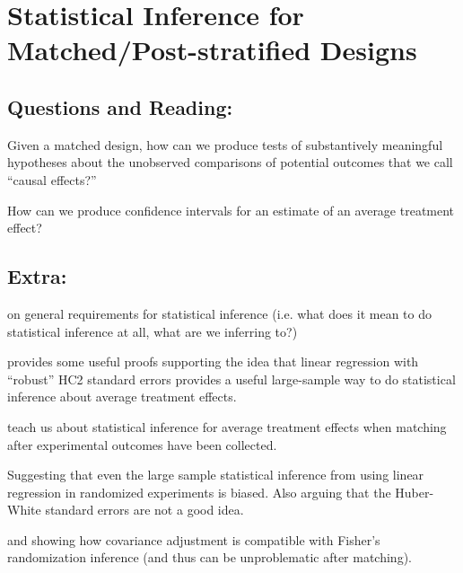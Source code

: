 \documentclass[10pt, letterpaper]{article}
\begin{document}
\AdvanceDate[1]
\section{Statistical Inference for Matched/Post-stratified Designs}


\subsection{Questions and Reading:}

Given a matched design, how can we produce tests of substantively meaningful
hypotheses about the unobserved comparisons of potential outcomes that we call
``causal effects?''

\citealp[Chap 2]{rosenbaum2010design}

How can we produce  confidence intervals for an estimate of an average
treatment effect?

\citealp[Chap 6.1 and Appendix 6.1]{dunning2012natural}

\citealp[Chap 17]{imbens2009causal}

\subsection{Extra:}

\citealp[Chap 4]{berk04} on general requirements for statistical
inference (i.e. what does it mean to do statistical inference at all, what are
we inferring to?)


\cite{linlr:2011} provides some useful proofs supporting the idea
that linear regression with ``robust'' HC2 standard errors provides a
useful large-sample way to do statistical inference about average
treatment effects.

\cite{miratrix2012adjusting} teach us about statistical inference for average
treatment effects when matching after experimental outcomes have been
collected.

\cite{freedman2008randomization,freedman2008rae,freedman2007rae,Free:2006:On-t}
Suggesting that even the large sample statistical inference from using
linear regression in randomized experiments is biased. Also arguing
that the Huber-White standard errors are not a good idea.

\cite{rosenbaum:2002a} and \cite{bowers2011fish} showing how
covariance adjustment is compatible with Fisher's randomization
inference (and thus can be unproblematic after matching).
\end{document}
